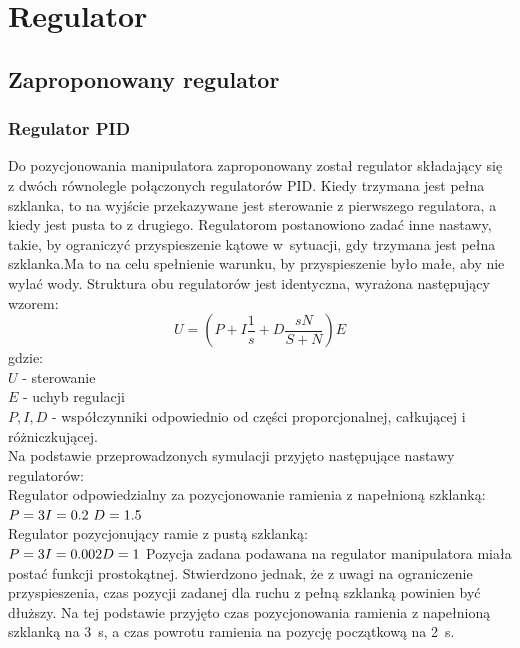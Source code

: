 \chapter{Regulator}
\label{cha:regulator}

\section{Zaproponowany regulator}
\subsection{Regulator PID}
Do pozycjonowania manipulatora zaproponowany został regulator składający się z dwóch równolegle połączonych regulatorów PID. Kiedy trzymana jest pełna szklanka, to na wyjście przekazywane jest sterowanie z pierwszego regulatora, a kiedy jest pusta to z drugiego. Regulatorom postanowiono zadać inne nastawy, takie, by ograniczyć przyspieszenie kątowe w~sytuacji, gdy trzymana jest pełna szklanka.Ma to na celu spełnienie warunku, by przyspieszenie było małe, aby nie wylać wody. Struktura obu regulatorów jest identyczna, wyrażona następujący wzorem:
\begin{equation}\label{key}
U = (P + I \frac{1}{s} + D\frac{sN}{S+N}) E
\end{equation}
gdzie:\\
$
U$ - sterowanie\\
$E$ - uchyb regulacji\\
$P, I, D$ - współczynniki odpowiednio od części proporcjonalnej, całkującej i różniczkującej.\\
Na podstawie przeprowadzonych symulacji przyjęto następujące nastawy regulatorów:\\
Regulator odpowiedzialny za pozycjonowanie ramienia z napełnioną szklanką:\\
$
P = 3\\
I = 0.2\\\
D = 1.5\\
$\\
Regulator pozycjonujący ramie z pustą szklanką:\\
$
P = 3\\
I = 0.002\\
D = 1\\
$
Pozycja zadana podawana na regulator manipulatora miała postać funkcji prostokątnej. Stwierdzono jednak, że z uwagi na ograniczenie przyspieszenia, czas pozycji zadanej dla ruchu z pełną szklanką powinien być dłuższy. Na tej podstawie przyjęto czas pozycjonowania ramienia z napełnioną szklanką na 3~s, a czas powrotu ramienia na pozycję początkową na 2~s.\\
